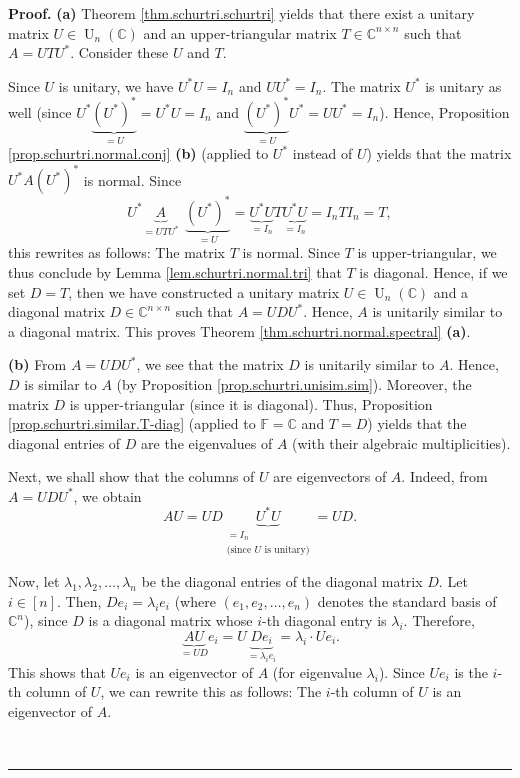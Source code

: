 \documentclass[numbers=enddot,12pt,final,onecolumn,notitlepage]{scrartcl}%
\numberwithin{exer}{subsection}
\theoremstyle{definition}
\newenvironment{proof}[1][Proof]{\noindent\textbf{#1.} }{\ \rule{0.5em}{0.5em}}
\begin{document}
\begin{proof}
\textbf{(a)} Theorem \ref{thm.schurtri.schurtri} yields that there exist a
unitary matrix $U\in\operatorname*{U}\nolimits_{n}\left(  \mathbb{C}\right)  $
and an upper-triangular matrix $T\in\mathbb{C}^{n\times n}$ such that
$A=UTU^{\ast}$. Consider these $U$ and $T$.

Since $U$ is unitary, we have $U^{\ast}U=I_{n}$ and $UU^{\ast}=I_{n}$. The
matrix $U^{\ast}$ is unitary as well (since $U^{\ast}\underbrace{\left(
U^{\ast}\right)  ^{\ast}}_{=U}=U^{\ast}U=I_{n}$ and $\underbrace{\left(
U^{\ast}\right)  ^{\ast}}_{=U}U^{\ast}=UU^{\ast}=I_{n}$). Hence, Proposition
\ref{prop.schurtri.normal.conj} \textbf{(b)} (applied to $U^{\ast}$ instead of
$U$) yields that the matrix $U^{\ast}A\left(  U^{\ast}\right)  ^{\ast}$ is
normal. Since%
\[
U^{\ast}\underbrace{A}_{=UTU^{\ast}}\ \ \underbrace{\left(  U^{\ast}\right)
^{\ast}}_{=U}=\underbrace{U^{\ast}U}_{=I_{n}}T\underbrace{U^{\ast}U}_{=I_{n}%
}=I_{n}TI_{n}=T,
\]
this rewrites as follows: The matrix $T$ is normal. Since $T$ is
upper-triangular, we thus conclude by Lemma \ref{lem.schurtri.normal.tri} that
$T$ is diagonal. Hence, if we set $D=T$, then we have constructed a unitary
matrix $U\in\operatorname*{U}\nolimits_{n}\left(  \mathbb{C}\right)  $ and a
diagonal matrix $D\in\mathbb{C}^{n\times n}$ such that $A=UDU^{\ast}$. Hence,
$A$ is unitarily similar to a diagonal matrix. This proves Theorem
\ref{thm.schurtri.normal.spectral} \textbf{(a)}. \medskip

\textbf{(b)} From $A=UDU^{\ast}$, we see that the matrix $D$ is unitarily
similar to $A$. Hence, $D$ is similar to $A$ (by Proposition
\ref{prop.schurtri.unisim.sim}). Moreover, the matrix $D$ is upper-triangular
(since it is diagonal). Thus, Proposition \ref{prop.schurtri.similar.T-diag}
(applied to $\mathbb{F}=\mathbb{C}$ and $T=D$) yields that the diagonal
entries of $D$ are the eigenvalues of $A$ (with their algebraic multiplicities).

Next, we shall show that the columns of $U$ are eigenvectors of $A$. Indeed,
from $A=UDU^{\ast}$, we obtain
\[
AU=UD\underbrace{U^{\ast}U}_{\substack{=I_{n}\\\text{(since }U\text{ is
unitary)}}}=UD.
\]


Now, let $\lambda_{1},\lambda_{2},\ldots,\lambda_{n}$ be the diagonal entries
of the diagonal matrix $D$. Let $i\in\left[  n\right]  $. Then, $De_{i}%
=\lambda_{i}e_{i}$ (where $\left(  e_{1},e_{2},\ldots,e_{n}\right)  $ denotes
the standard basis of $\mathbb{C}^{n}$), since $D$ is a diagonal matrix whose
$i$-th diagonal entry is $\lambda_{i}$. Therefore,%
\[
\underbrace{AU}_{=UD}e_{i}=U\underbrace{De_{i}}_{=\lambda_{i}e_{i}}%
=\lambda_{i}\cdot Ue_{i}.
\]
This shows that $Ue_{i}$ is an eigenvector of $A$ (for eigenvalue $\lambda
_{i}$). Since $Ue_{i}$ is the $i$-th column of $U$, we can rewrite this as
follows: The $i$-th column of $U$ is an eigenvector of $A$.


\end{proof}
\end{document}
